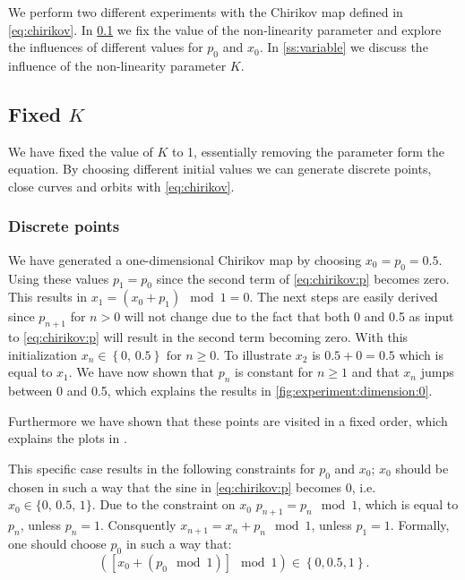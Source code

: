 We perform two different experiments with the Chirikov map defined in \cref{eq:chirikov}. In \cref{ss:fixed} we fix the value of the non-linearity parameter and explore the influences of different values for $p_0$ and $x_0$. In \cref{ss:variable} we discuss the influence of the non-linearity parameter $K$.

\subsection[]{Fixed $K$}
\label{ss:fixed}
	We have fixed the value of $K$ to 1, essentially removing the parameter form the equation. By choosing different initial values we can generate discrete points, close curves and orbits with \cref{eq:chirikov}.
	
	\subsubsection{Discrete points}
	We have generated a one-dimensional Chirikov map by choosing $x_0 = p_0 = 0.5$. Using these values $p_1 = p_0$ since the second term of \eqref{eq:chirikov:p} becomes zero. This results in $x_1 = \left( x_0 + p_{1} \right) \mod 1= 0$. The next steps are easily derived since $p_{n + 1}$ for $n > 0$ will not change due to the fact that both 0 and 0.5 as input to \eqref{eq:chirikov:p} will result in the second term becoming zero. With this initialization $x_{n} \in \left\{0,\, 0.5 \right\} \text{ for } n \geq 0$. To illustrate $x_2$ is $0.5 + 0 = 0.5$ which is equal to $x_1$. We have now shown that $p_n$ is constant for $n \geq 1$ and that $x_n$ jumps between 0 and 0.5, which explains the results in \cref{fig:experiment:dimension:0}. 

	Furthermore we have shown that these points are visited in a fixed order, which explains the plots in .

	This specific case results in the following constraints for $p_0$ and $x_0$; $x_0$ should be chosen in such a way that the sine in \cref{eq:chirikov:p} becomes 0, i.e. $x_0 \in \{0,\, 0.5,\, 1\}$. Due to the constraint on $x_0$ $p_{n + 1} = p_{n} \mod 1$, which is equal to $p_n$, unless $p_n = 1$. Consquently $x_{n + 1} = x_n + p_n \mod 1$, unless $p_1 = 1$. Formally, one should choose $p_0$ in such a way that:
	\begin{equation*}
		\left( \left[ x_0 + (p_0 \mod 1)\right] \mod 1 \right) \in \left\{0, 0.5, 1\right\}.
	\end{equation*}
	
